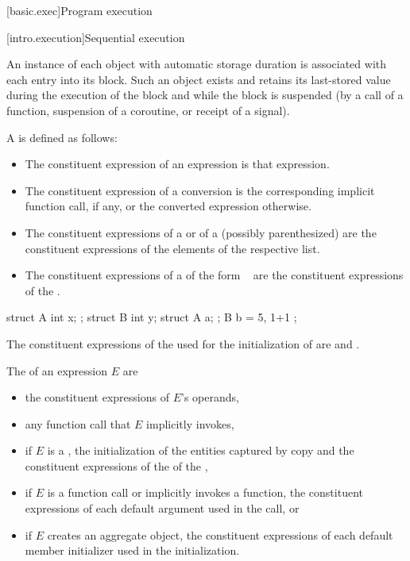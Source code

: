 [basic.exec]{Program execution}

[intro.execution]{Sequential execution}

\pnum
An instance of each object with automatic storage
duration is associated with each entry into its
block. Such an object exists and retains its last-stored value during
the execution of the block and while the block is suspended (by a call
of a function, suspension of a coroutine, or receipt of a signal).

\pnum
A  is defined as follows:
\begin{itemize}
\item
The constituent expression of an expression is that expression.
\item
The constituent expression of a conversion is
the corresponding implicit function call, if any, or
the converted expression otherwise.
\item
The constituent expressions of a  or
of a (possibly parenthesized) 
are the constituent expressions of the elements of the respective list.
\item
The constituent expressions of a 
of the form \tcode{=}~
are the constituent expressions of the .
\end{itemize}
\begin{example}
\begin{codeblock}
struct A { int x; };
struct B { int y; struct A a; };
B b = { 5, { 1+1 } };
\end{codeblock}
The constituent expressions of the 
used for the initialization of  are  and .
\end{example}

\pnum
The  of an expression $E$ are
\begin{itemize}
\item
the constituent expressions of $E$'s operands,
\item
any function call that $E$ implicitly invokes,
\item
if $E$ is a ,
the initialization of the entities captured by copy and
the constituent expressions of the  of the ,
\item
if $E$ is a function call or implicitly invokes a function,
the constituent expressions of each default argument
used in the call, or
\item
if $E$ creates an aggregate object,
the constituent expressions of each default member initializer
used in the initialization.
\end{itemize}

